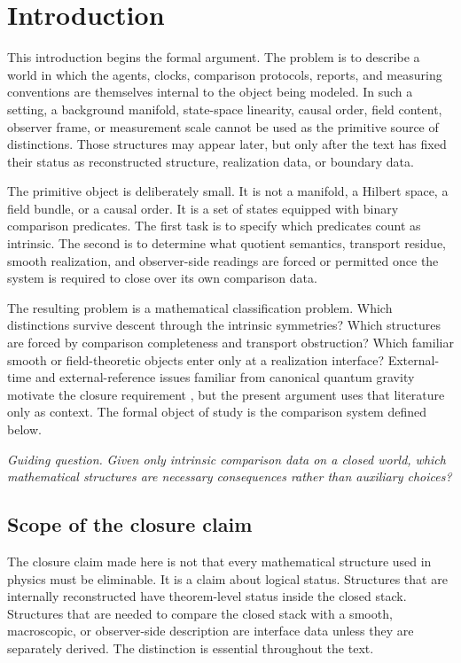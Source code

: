 \chapter*{Introduction}
{}
\label{ch:introduction}
This introduction begins the formal argument.
The problem is to describe a world in which the agents, clocks,
comparison protocols, reports, and measuring conventions are themselves
internal to the object being modeled.
In such a setting, a background manifold, state-space linearity, causal
order, field content, observer frame, or measurement scale cannot be used
as the primitive source of distinctions.
Those structures may appear later, but only after the text has fixed
their status as reconstructed structure, realization data, or boundary
data.

The primitive object is deliberately small.
It is not a manifold, a Hilbert space, a field bundle, or a causal order.
It is a set of states equipped with binary comparison predicates.
The first task is to specify which predicates count as intrinsic.
The second is to determine what quotient semantics, transport residue,
smooth realization, and observer-side readings are forced or permitted
once the system is required to close over its own comparison data.

The resulting problem is a mathematical classification problem.
Which distinctions survive descent through the intrinsic symmetries?
Which structures are forced by comparison completeness and transport
obstruction?
Which familiar smooth or field-theoretic objects enter only at a
realization interface?
External-time and external-reference issues familiar from canonical
quantum gravity motivate the closure requirement
\cite{Isham1993,Kuchar1992,Anderson2017}, but the present argument uses
that literature only as context.  The formal object of study is the
comparison system defined below.

\medskip
\noindent
\emph{Guiding question.}
\emph{Given only intrinsic comparison data on a closed world, which
mathematical structures are necessary consequences rather than
auxiliary choices?}
\medskip

\section{Scope of the closure claim}
The closure claim made here is not that every mathematical structure used
in physics must be eliminable.
It is a claim about logical status.
Structures that are internally reconstructed have theorem-level status
inside the closed stack.
Structures that are needed to compare the closed stack with a smooth,
macroscopic, or observer-side description are interface data unless they
are separately derived.
The distinction is essential throughout the text.

